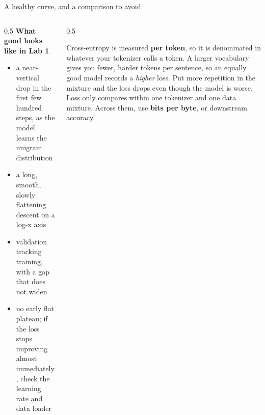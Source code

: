 \documentclass[aspectratio=169,10pt]{beamer}
\begin{document}
\begin{frame}{A healthy curve, and a comparison to avoid}
  \begin{columns}[T]
    \begin{column}{0.5\textwidth}
      \textbf{What good looks like in Lab 1}
      \begin{itemize}
        \item a near-vertical drop in the first few hundred steps, as the model
          learns the unigram distribution
        \item a long, smooth, slowly flattening descent on a log-x axis
        \item validation tracking training, with a gap that does not widen
        \item no early flat plateau; if the loss stops improving almost
          immediately, check the learning rate and data loader
      \end{itemize}
    \end{column}
    \begin{column}{0.5\textwidth}
      \begin{gotcha}
        Cross-entropy is measured \textbf{per token}, so it is denominated in
        whatever your tokenizer calls a token.
        \vspace{0.3em}
        A larger vocabulary gives you fewer, harder tokens per sentence, so an
        equally good model records a \emph{higher} loss. Put more repetition in
        the mixture and the loss drops even though the model is worse.
        \vspace{0.3em}
        Loss only compares within one tokenizer and one data mixture. Across
        them, use \textbf{bits per byte}, or downstream accuracy.
      \end{gotcha}
    \end{column}
  \end{columns}
\end{frame}
\end{document}
